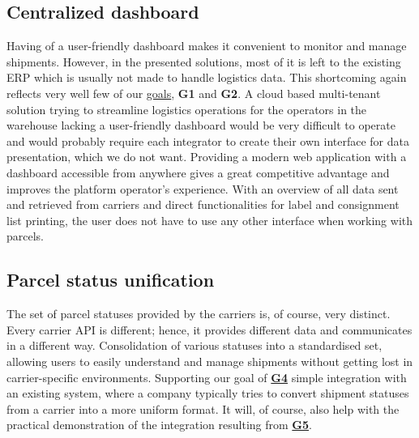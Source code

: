 \subsection{Centralized dashboard}
Having of a user-friendly dashboard makes it convenient to monitor and manage shipments. However, in the presented solutions, most of it is left to the existing \ac{ERP} which is usually not made to handle logistics data.
This shortcoming again reflects very well few of our \hyperref[subsec:project-goals]{goals}, \textbf{G1} and \textbf{G2}. A cloud based multi-tenant solution trying to streamline logistics operations for the operators in the warehouse lacking a user-friendly dashboard would be very difficult to operate and would probably require each integrator to create their own interface for data presentation, which we do not want.
Providing a modern web application with a dashboard accessible from anywhere gives a great competitive advantage and improves the platform operator's experience. %
With an overview of all data sent and retrieved from carriers and direct functionalities for label and consignment list printing, the user does not have to use any other interface when working with parcels.

\subsection{Parcel status unification}
The set of parcel statuses provided by the carriers is, of course, very distinct. Every carrier API is different; hence, it provides different data and communicates in a different way.
Consolidation of various statuses into a standardised set, allowing users to easily understand and manage shipments without getting lost in carrier-specific environments.
Supporting our goal of \hyperref[subsec:project-goals]{\textbf{G4}} simple integration with an existing system, where a company typically tries to convert shipment statuses from a carrier into a more uniform format. It will, of course, also help with the practical demonstration of the integration resulting from \hyperref[subsec:project-goals]{\textbf{G5}}.

